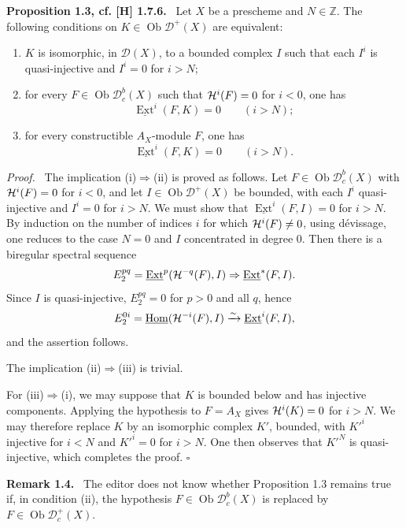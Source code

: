 \documentclass[11pt]{article}
\theoremstyle{plain}
\theoremstyle{definition}
\theoremstyle{remark}
\newenvironment{statement}[1]{\par\medskip\noindent\textbf{#1.}\ }{\par\medskip}
\newenvironment{prooftext}{\par\noindent\textit{Proof.}\ }{\par\medskip}
\newcommand{\ZZ}{\mathbb Z}
\newcommand{\D}{\mathcal D}\newcommand{\E}{\mathcal E}\newcommand{\F}{\mathcal F}
\DeclareMathOperator{\Hom}{Hom}
\DeclareMathOperator{\Ext}{Ext}
\DeclareMathOperator{\ob}{Ob}
\newcommand{\qedtext}{\hfill$\square$}
\begin{document}
\begin{statement}{Proposition 1.3, cf. [H] 1.7.6}
Let $X$ be a prescheme and $N\in\ZZ$. The following conditions on $K\in\ob\D^+(X)$ are equivalent:
\begin{enumerate}[label=(\roman*)]
\item $K$ is isomorphic, in $\D(X)$, to a bounded complex $I$ such that each $I^i$ is quasi-injective and $I^i=0$ for $i>N$;
\item for every $F\in\ob\D_c^b(X)$ such that $\mathcal H^i(F)=0$ for $i<0$, one has
\[
   \underline{\Ext}^i(F,K)=0\qquad(i>N);
\]
\item for every constructible $A_X$-module $F$, one has
\[
   \underline{\Ext}^i(F,K)=0\qquad(i>N).
\]
\end{enumerate}
\end{statement}

\begin{prooftext}
The implication (i)$\Rightarrow$(ii) is proved as follows. Let $F\in\ob\D_c^b(X)$ with $\mathcal H^i(F)=0$ for $i<0$, and let $I\in\ob\D^+(X)$ be bounded, with each $I^i$ quasi-injective and $I^i=0$ for $i>N$. We must show that $\underline{\Ext}^i(F,I)=0$ for $i>N$. By induction on the number of indices $i$ for which $\mathcal H^i(F)\ne0$, using dévissage, one reduces to the case $N=0$ and $I$ concentrated in degree $0$. Then there is a biregular spectral sequence
\[
   E_2^{pq}=\underline{\Ext}^p(\Hh^{-q}(F),I)\Rightarrow \underline{\Ext}^*(F,I).
\]
Since $I$ is quasi-injective, $E_2^{pq}=0$ for $p>0$ and all $q$, hence
\[
   E_2^{0i}=\underline{\Hom}(\Hh^{-i}(F),I)\xrightarrow{\sim}\underline{\Ext}^{i}(F,I),
\]
and the assertion follows.

The implication (ii)$\Rightarrow$(iii) is trivial.

For (iii)$\Rightarrow$(i), we may suppose that $K$ is bounded below and has injective components. Applying the hypothesis to $F=A_X$ gives $\mathcal H^i(K)=0$ for $i>N$. We may therefore replace $K$ by an isomorphic complex $K'$, bounded, with $K'^i$ injective for $i<N$ and $K'^i=0$ for $i>N$. One then observes that $K'^N$ is quasi-injective, which completes the proof. \qedtext
\end{prooftext}

\begin{statement}{Remark 1.4}
The editor does not know whether Proposition 1.3 remains true if, in condition (ii), the hypothesis $F\in\ob\D_c^b(X)$ is replaced by $F\in\ob\D_c^+(X)$.
\end{statement}
\end{document}

